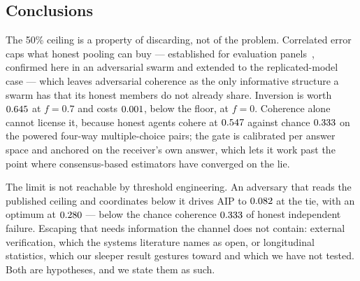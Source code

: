 \subsection{Conclusions}

The 50\% ceiling is a property of discarding, not of the problem. Correlated error
caps what honest pooling can buy --- established for evaluation
panels~\cite{judgecorr,panelcorr}, confirmed here in an adversarial swarm and
extended to the replicated-model case --- which leaves adversarial coherence as
the only informative structure a swarm has that its honest members do not already
share. Inversion is worth $0.645$ at $f=0.7$ and costs
$0.001$, below the floor, at $f=0$. Coherence alone cannot
license it, because honest agents cohere at $0.547$ against chance
$0.333$ on the powered four-way multiple-choice pairs; the gate is
calibrated per answer space and anchored on the
receiver's own answer, which lets it work past the point where consensus-based
estimators have converged on the lie.

The limit is not reachable by threshold engineering. An adversary that reads the
published ceiling and coordinates below it drives AIP to $0.082$ at
the tie, with an optimum at $0.280$ --- below the chance coherence
$0.333$ of honest independent failure. Escaping that needs
information the channel does not contain: external verification, which the
systems literature names as open, or longitudinal statistics, which our sleeper
result gestures toward and which we have not tested. Both are hypotheses, and we
state them as such.
